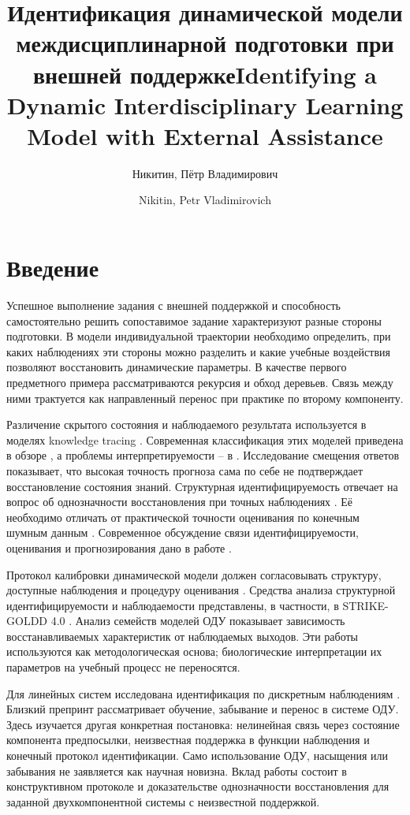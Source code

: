 \documentclass[blind]{psta}
\title[Идентификация модели подготовки]{Идентификация динамической модели междисциплинарной подготовки при внешней поддержке}
\author{Никитин, Пётр Владимирович}
\title[Identifying a dynamic learning model]{Identifying a Dynamic Interdisciplinary Learning Model with External Assistance}
\author{Nikitin, Petr Vladimirovich}
\begin{document}
\raggedbottom
\Russian
\maketitle
{}
\FloatBarrier
\section*{Введение}
Успешное выполнение задания с внешней поддержкой и способность самостоятельно решить сопоставимое задание характеризуют разные стороны подготовки. В модели индивидуальной траектории необходимо определить, при каких наблюдениях эти стороны можно разделить и какие учебные воздействия позволяют восстановить динамические параметры. В качестве первого предметного примера рассматриваются рекурсия и обход деревьев. Связь между ними трактуется как направленный перенос при практике по второму компоненту.

Различение скрытого состояния и наблюдаемого результата используется в моделях knowledge tracing \cite{ref1}. Современная классификация этих моделей приведена в обзоре \cite{ref2}, а проблемы интерпретируемости – в \cite{ref3}. Исследование смещения ответов \cite{ref4} показывает, что высокая точность прогноза сама по себе не подтверждает восстановление состояния знаний. Структурная идентифицируемость отвечает на вопрос об однозначности восстановления при точных наблюдениях \cite{ref5}. Её необходимо отличать от практической точности оценивания по конечным шумным данным \cite{ref6}. Современное обсуждение связи идентифицируемости, оценивания и прогнозирования дано в работе \cite{ref7}.

Протокол калибровки динамической модели должен согласовывать структуру, доступные наблюдения и процедуру оценивания \cite{ref8}. Средства анализа структурной идентифицируемости и наблюдаемости представлены, в частности, в STRIKE-GOLDD 4.0 \cite{ref9}. Анализ семейств моделей ОДУ \cite{ref10} показывает зависимость восстанавливаемых характеристик от наблюдаемых выходов. Эти работы используются как методологическая основа; биологические интерпретации их параметров на учебный процесс не переносятся.

Для линейных систем исследована идентификация по дискретным наблюдениям \cite{ref11}. Близкий препринт \cite{ref12} рассматривает обучение, забывание и перенос в системе ОДУ. Здесь изучается другая конкретная постановка: нелинейная связь через состояние компонента предпосылки, неизвестная поддержка в функции наблюдения и конечный протокол идентификации. Само использование ОДУ, насыщения или забывания не заявляется как научная новизна. Вклад работы состоит в конструктивном протоколе и доказательстве однозначности восстановления для заданной двухкомпонентной системы с неизвестной поддержкой.
\end{document}
